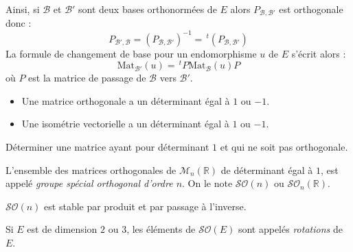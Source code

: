 \documentclass[a4paper,10pt]{report}
\begin{document}
\begin{preuve}
\vspace{3cm}
\end{preuve}

\begin{rem} Ainsi, si $\mathcal{B}$ et $\mathcal{B}'$ sont deux bases orthonormées de $E$ alors $P_{\mathcal{B}, \mathcal{B}'}$ est orthogonale donc :
$$P_{\mathcal{B}', \mathcal{B}} = (P_{\mathcal{B}, \mathcal{B}'})^{-1} = \, ^t(P_{\mathcal{B}, \mathcal{B}'})$$
La formule de changement de base pour un endomorphisme $u$ de $E$ s'écrit alors :
$$ \textrm{Mat}_{\mathcal{B'}}(u) = \,  ^tP \textrm{Mat}_{\mathcal{B}}(u) P$$
où $P$ est la matrice de passage de $\mathcal{B}$ vers $\mathcal{B}'$.
\end{rem}

\begin{prop} 
\begin{itemize}
\item Une matrice orthogonale a un déterminant égal à $1$ ou $-1$.
\item Une isométrie vectorielle a un déterminant égal à $1$ ou $-1$.
\end{itemize}
\end{prop}

\begin{preuve}
\vspace{4cm}
\end{preuve}

\begin{exa} Déterminer une matrice ayant pour déterminant $1$ et qui ne soit pas orthogonale.
\end{exa}

\begin{defin} L'ensemble des matrices orthogonales de $\mathcal{M}_n(\mathbb{R})$ de déterminant égal à $1$, est appelé \textit{groupe spécial orthogonal d'ordre $n$}. On le note $\mathcal{SO}(n)$ ou $\mathcal{SO}_n(\mathbb{R})$.
\end{defin}

\begin{prop} $\mathcal{SO}(n)$ est stable par produit et par passage à l'inverse.
\end{prop}

\begin{preuve}

\vspace{3cm}
\end{preuve}

\begin{defin} Si $E$ est de dimension $2$ ou $3$, les éléments de $\mathcal{SO}(E)$ sont appelés \textit{rotations} de $E$.
\end{defin}
\end{document}
